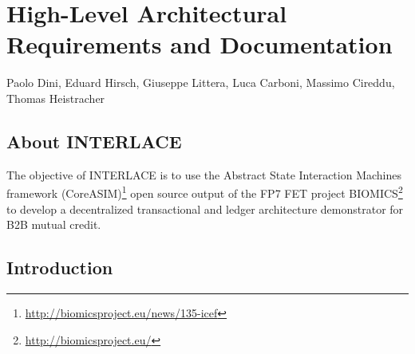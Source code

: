 \chapter{High-Level Architectural Requirements and Documentation}
\label{ch:archreq}

\vspace{-1cm}
\begin{center}
Paolo Dini, Eduard Hirsch, Giuseppe Littera, Luca Carboni, Massimo Cireddu, Thomas Heistracher
\end{center}

\section{About INTERLACE}
The objective of INTERLACE is to use the Abstract State Interaction Machines framework (CoreASIM)\footnote{\url{http://biomicsproject.eu/news/135-icef}} open source output of the FP7 FET project BIOMICS\footnote{\url{http://biomicsproject.eu/}}  to develop a decentralized transactional and ledger architecture demonstrator for B2B mutual credit.

\section{Introduction}\label{section-introduction-and-goals}
